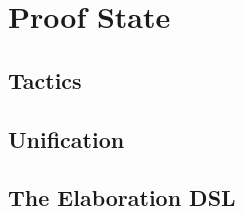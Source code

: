 \section{Proof State}

\subsection{Tactics}

\subsection{Unification}

\subsection{The Elaboration DSL}
